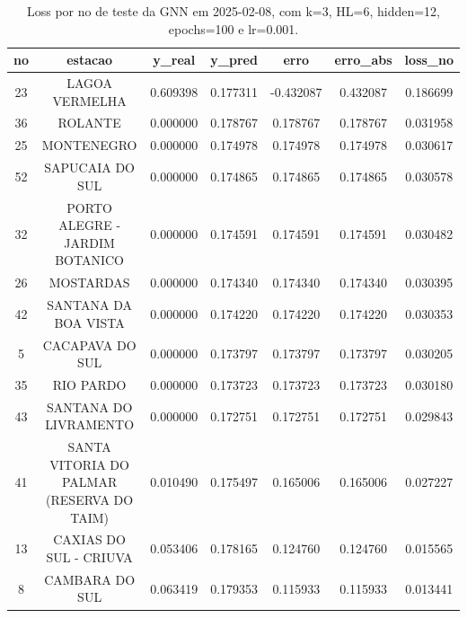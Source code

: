 \begin{table}[h]
\centering
\caption{Loss por no de teste da GNN em 2025-02-08, com k=3, HL=6, hidden=12, epochs=100 e lr=0.001.}
\label{tab:gnn_loss_k3_hl6_h12_e100_d20250208}
\begin{tabular}{ccccccc}
\toprule
no & estacao & y\_real & y\_pred & erro & erro\_abs & loss\_no \\
\midrule
23 & LAGOA VERMELHA & 0.609398 & 0.177311 & -0.432087 & 0.432087 & 0.186699 \\
36 & ROLANTE & 0.000000 & 0.178767 & 0.178767 & 0.178767 & 0.031958 \\
25 & MONTENEGRO & 0.000000 & 0.174978 & 0.174978 & 0.174978 & 0.030617 \\
52 & SAPUCAIA DO SUL & 0.000000 & 0.174865 & 0.174865 & 0.174865 & 0.030578 \\
32 & PORTO ALEGRE - JARDIM BOTANICO & 0.000000 & 0.174591 & 0.174591 & 0.174591 & 0.030482 \\
26 & MOSTARDAS & 0.000000 & 0.174340 & 0.174340 & 0.174340 & 0.030395 \\
42 & SANTANA DA BOA VISTA & 0.000000 & 0.174220 & 0.174220 & 0.174220 & 0.030353 \\
5 & CACAPAVA DO SUL & 0.000000 & 0.173797 & 0.173797 & 0.173797 & 0.030205 \\
35 & RIO PARDO & 0.000000 & 0.173723 & 0.173723 & 0.173723 & 0.030180 \\
43 & SANTANA DO LIVRAMENTO & 0.000000 & 0.172751 & 0.172751 & 0.172751 & 0.029843 \\
41 & SANTA VITORIA DO PALMAR (RESERVA DO TAIM) & 0.010490 & 0.175497 & 0.165006 & 0.165006 & 0.027227 \\
13 & CAXIAS DO SUL - CRIUVA & 0.053406 & 0.178165 & 0.124760 & 0.124760 & 0.015565 \\
8 & CAMBARA DO SUL & 0.063419 & 0.179353 & 0.115933 & 0.115933 & 0.013441 \\
\bottomrule
\end{tabular}
\end{table}
